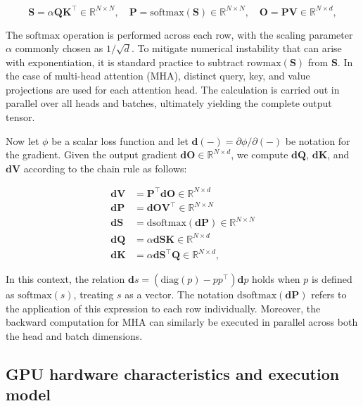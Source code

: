 \begin{equation*}
  \mathbf{S} = \alpha \mathbf{Q} \mathbf{K}^\top \in \mathbb{R}^{N \times N}, \quad \mathbf{P} = \mathrm{softmax}(\mathbf{S}) \in \mathbb{R}^{N \times N}, \quad \mathbf{O} = \mathbf{P}\mathbf{V} \in \mathbb{R}^{N \times d},
\end{equation*}

The $\mathrm{softmax}$ operation is performed across each row, with the scaling parameter $\alpha$ commonly chosen as $1/\sqrt{d}$. To mitigate numerical instability that can arise with exponentiation, it is standard practice to subtract $\mathrm{rowmax}(\mathbf{S})$ from $\mathbf{S}$. In the case of multi-head attention (MHA), distinct query, key, and value projections are used for each attention head. The calculation is carried out in parallel over all heads and batches, ultimately yielding the complete output tensor.

Now let $\phi$ be a scalar loss function and let $\mathbf{d}(-) = \partial \phi / \partial (-)$ be notation for the gradient. Given the output gradient $\mathbf{dO} \in \mathbb{R}^{N \times d}$, we compute $\mathbf{dQ}$, $\mathbf{dK}$, and $\mathbf{dV}$ according to the chain rule as follows:

\begin{align*}
  \mathbf{dV} &= \mathbf{P}^\top \mathbf{dO} \in \mathbb{R}^{N \times d} \\
  \mathbf{dP} &= \mathbf{dO} \mathbf{V}^\top \in \mathbb{R}^{N \times N} \\
  \mathbf{dS} &= \mathrm{dsoftmax} (\mathbf{dP}) \in \mathbb{R}^{N \times N} \\
  \mathbf{dQ} &= \alpha \mathbf{dS} \mathbf{K} \in \mathbb{R}^{N \times d} \\
  \mathbf{dK} &= \alpha \mathbf{dS}^\top \mathbf{Q} \in \mathbb{R}^{N \times d},
\end{align*}

In this context, the relation $\mathbf{d}s = (\mathrm{diag}(p) - p p^\top)\mathbf{d}p$ holds when $p$ is defined as $\mathrm{softmax}(s)$, treating $s$ as a vector. The notation $\mathrm{dsoftmax}(\mathbf{dP})$ refers to the application of this expression to each row individually. Moreover, the backward computation for MHA can similarly be executed in parallel across both the head and batch dimensions.

\subsection{GPU hardware characteristics and execution model}
\label{subsec:hardware}

